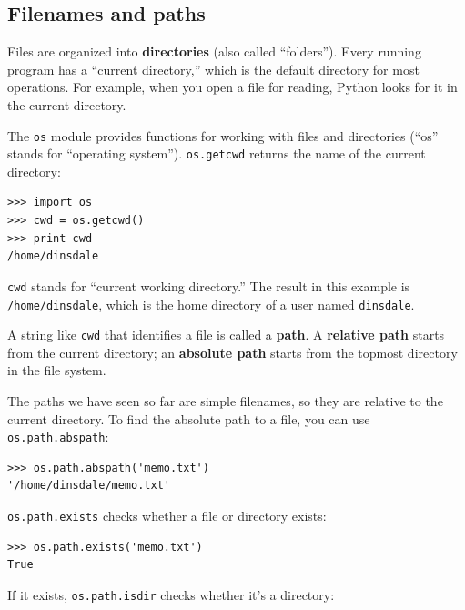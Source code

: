 \documentclass[10pt]{book}
\begin{document}
\begin{CJK}{UTF8}{gbsn}


\section{Filenames and paths}
\label{paths}

Files are organized into {\bf directories} (also called ``folders'').
Every running program has a ``current directory,'' which is the
default directory for most operations.  
For example, when you open a file for reading, Python looks for it in the
current directory.

The {\tt os} module provides functions for working with files and
directories (``os'' stands for ``operating system'').  {\tt os.getcwd}
returns the name of the current directory:

\begin{verbatim}
>>> import os
>>> cwd = os.getcwd()
>>> print cwd
/home/dinsdale
\end{verbatim}
%
{\tt cwd} stands for ``current working directory.''  The result in
this example is {\tt /home/dinsdale}, which is the home directory of a
user named {\tt dinsdale}.

A string like {\tt cwd} that identifies a file is called a {\bf path}.
A {\bf relative path} starts from the current directory;
an {\bf absolute path} starts from the topmost directory in the
file system.

The paths we have seen so far are simple filenames, so they are
relative to the current directory.  To find the absolute path to
a file, you can use {\tt os.path.abspath}:

\begin{verbatim}
>>> os.path.abspath('memo.txt')
'/home/dinsdale/memo.txt'
\end{verbatim}
%
{\tt os.path.exists} checks
whether a file or directory exists:

\begin{verbatim}
>>> os.path.exists('memo.txt')
True
\end{verbatim}
%
If it exists, {\tt os.path.isdir} checks whether it's a directory:


\end{CJK}
\end{document}
